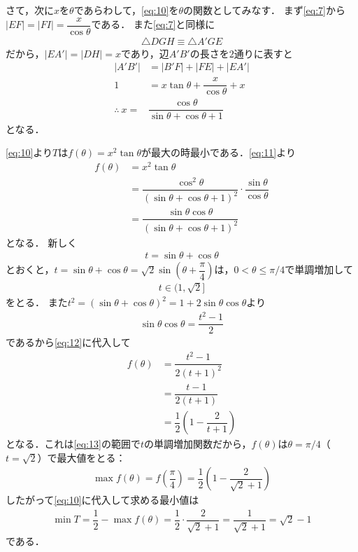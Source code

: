 \documentclass[../../main.tex]{subfiles}
\begin{document}
さて，次に$x$を$\theta$であらわして，\cref{eq:10}を$\theta$の関数としてみなす．
まず\cref{eq:7}から$|EF|=|FI|=\dfrac{x}{\cos\theta}$である．
また\cref{eq:7}と同様に
\begin{align}
  \triangle DGH \equiv \triangle A'GE
\end{align}
だから，$|EA'|=|DH|=x$であり，辺$A'B'$の長さを$2$通りに表すと
\begin{align}
  |A'B'| &= |B'F|+|FE|+|EA'| \\
  1&=x\tan\theta+\dfrac{x}{\cos\theta}+x \\
  \therefore\
  x=&\dfrac{\cos\theta}{\sin\theta+\cos\theta+1} \label{eq:11}
\end{align}
となる．

\cref{eq:10}より$T$は$f(\theta)=x^2\tan\theta$が最大の時最小である．\cref{eq:11}より
\begin{align}
  f(\theta)
  &=x^2\tan\theta \\
  &=\dfrac{\cos^2\theta}{(\sin\theta+\cos\theta+1)^2}\cdot\dfrac{\sin\theta}{\cos\theta} \\
  &=\dfrac{\sin\theta\cos\theta}{(\sin\theta+\cos\theta+1)^2} \label{eq:12}
\end{align}
となる．
新しく
\begin{align}
  t = \sin\theta + \cos\theta
\end{align}
とおくと，$t=\sin\theta+\cos\theta=\sqrt{2}\sin\left(\theta+\dfrac{\pi}{4}\right)$は，$0<\theta\le\pi/4$で単調増加して
\begin{align}
  t\in(1,\sqrt{2}] \label{eq:13}
\end{align}
をとる．
また$t^2=(\sin\theta+\cos\theta)^2=1+2\sin\theta\cos\theta$より
\begin{align}
  \sin\theta\cos\theta=\dfrac{t^2-1}{2}
\end{align}
であるから\cref{eq:12}に代入して
\begin{align}
  f(\theta)
  &= \dfrac{t^2-1}{2(t+1)^2} \\
  &=\dfrac{t-1}{2(t+1)} \\
  &=\dfrac{1}{2}\left(1-\dfrac{2}{t+1}\right)
\end{align}
となる．これは\cref{eq:13}の範囲で$t$の単調増加関数だから，$f(\theta)$は$\theta=\pi/4$（$t=\sqrt{2}$）で最大値をとる：
\begin{align}
  \max f(\theta)= f\left(\dfrac{\pi}{4}\right)= \dfrac{1}{2}\left(1-\dfrac{2}{\sqrt{2}+1}\right)
\end{align}
したがって\cref{eq:10}に代入して求める最小値は
\begin{align}
  \min T=\dfrac{1}{2}-\max f(\theta)=\dfrac{1}{2}\cdot\dfrac{2}{\sqrt{2}+1}=\dfrac{1}{\sqrt{2}+1}=\sqrt{2}-1
\end{align}
である．
\end{document}
